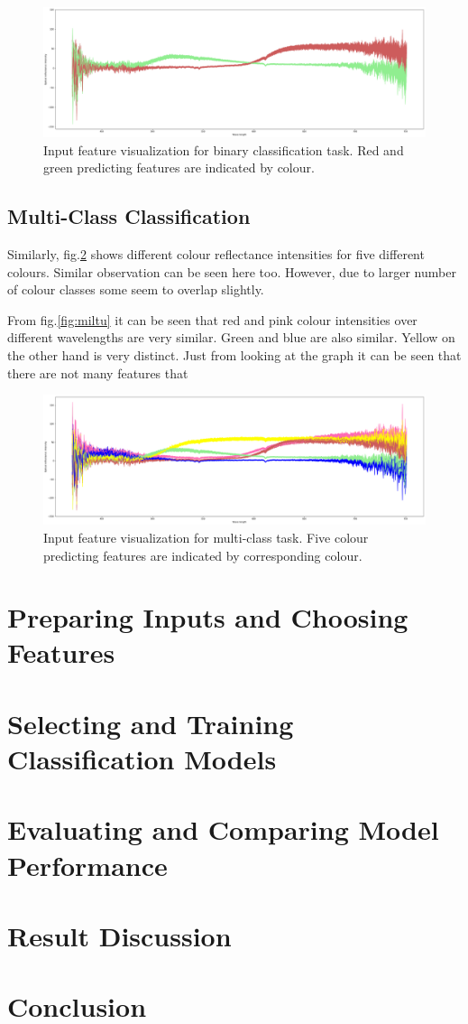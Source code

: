 \documentclass[11pt]{article}
\begin{document}
			\begin{figure}[H]
				\includegraphics[width=1\textwidth]{png/binary_default}
				\caption{Input feature visualization for binary classification task. Red and green predicting features are indicated by colour.}
				\label{fig:binary}
			\end{figure}

		\subsection{Multi-Class Classification}

			Similarly, fig.\ref{fig:multi} shows different colour reflectance intensities for five different colours. Similar observation can be seen here too. However, due to larger number of colour classes some seem to overlap slightly. 

			From fig.\ref{fig:miltu} it can be seen that red and pink colour intensities over different wavelengths are very similar. Green and blue are also similar. Yellow on the other hand is very distinct. Just from looking at the graph it can be seen that there are not many features that 

			\begin{figure}[H]
				\includegraphics[width=1\textwidth]{png/multi_default}
				\caption{Input feature visualization for multi-class task. Five colour predicting features are indicated by corresponding colour.}
				\label{fig:multi}
			\end{figure}

	\section{Preparing Inputs and Choosing Features}
	\section{Selecting and Training Classification Models}
	\section{Evaluating and Comparing Model Performance}
	\section{Result Discussion}


	\section{Conclusion}
	
\end{document}
